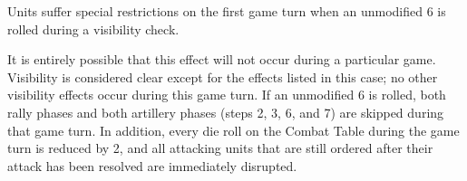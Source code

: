  Units suffer special restrictions on the first game turn when an unmodified 6 is rolled during a visibility check.

It is entirely possible that this effect will not occur during a particular game. Visibility is considered clear except for the effects listed in this case; no other visibility effects occur during this game turn. If an unmodified 6 is rolled, both rally phases and both artillery phases (steps 2, 3, 6, and 7) are skipped during that game turn. In addition, every die roll on the Combat Table during the game turn is reduced by 2, and all attacking units that are still ordered after their attack has been resolved are immediately disrupted.
